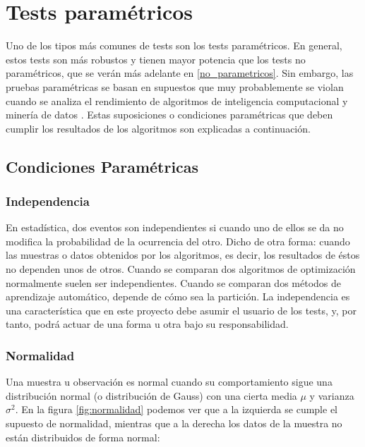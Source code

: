 
\section{Tests paramétricos}
Uno de los tipos más comunes de tests son los tests paramétricos. En general, estos tests son más robustos y
tienen mayor potencia que los tests no paramétricos, que se verán más adelante en \ref{no_parametricos}. Sin
embargo, las pruebas paramétricas se basan en supuestos que muy probablemente se violan cuando se analiza el
rendimiento de algoritmos de inteligencia computacional y minería de datos \cite{parametricos}. Estas suposiciones
o condiciones paramétricas que deben cumplir los resultados de los algoritmos son explicadas a continuación.


\subsection{Condiciones Paramétricas}

\subsubsection{Independencia}
En estadística, dos eventos son independientes si cuando uno de ellos se da no modifica la probabilidad de la
ocurrencia del otro. Dicho de otra forma: cuando las muestras o datos obtenidos por los algoritmos, es decir, los
resultados de éstos no dependen unos de otros. Cuando se comparan dos algoritmos de optimización normalmente suelen
ser independientes. Cuando se comparan dos métodos de aprendizaje automático, depende de cómo sea la partición.
La independencia es una característica que en este proyecto debe asumir el usuario de los tests, y, por tanto,
podrá actuar de una forma u otra bajo su responsabilidad.

\subsubsection{Normalidad}
Una muestra u observación es normal cuando su comportamiento sigue una distribución normal (o distribución de
Gauss) con una cierta media $\mu$ y varianza $\sigma^2$. En la figura \ref{fig:normalidad} podemos ver que a la
izquierda se cumple el supuesto de normalidad, mientras que a la derecha los datos de la muestra no están distribuidos
de forma normal:

